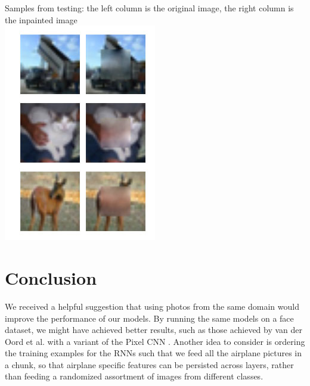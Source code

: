 \documentclass[10pt,twocolumn,letterpaper]{article}
\begin{document}
Samples from testing: the left column is the original image, the right column is the inpainted image \\
\includegraphics[width=0.8\linewidth]{baseline_test.jpg} 




\section{Conclusion}

We received a helpful suggestion that using photos from the same domain would improve the performance of our models. By running the same models on a face dataset, we might have achieved better results, such as those achieved by van der Oord et al. with a variant of the Pixel CNN \cite{pixelCNN}. Another idea to consider is ordering the training examples for the RNNs such that we feed all the airplane pictures in a chunk, so that airplane specific features can be persisted across layers, rather than feeding a randomized assortment of images from different classes.\\
\end{document}
